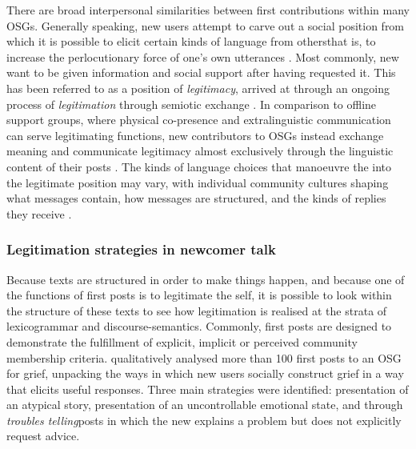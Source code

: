 There are broad interpersonal similarities between first contributions within many \glspl{OSG}. Generally speaking, new users attempt to carve out a social position from which it is possible to elicit certain kinds of language from others\textemdash{}that is, to increase the perlocutionary force of one's own utterances \cite{austin_how_1975,roberts_communicative_1996}. Most commonly, new  want to be given information and social support after having requested it. This has been referred to as a position of \emph{legitimacy}, arrived at through an ongoing process of \emph{legitimation} through semiotic exchange \cite{davies_communities_2005,smithson_developing_2012,van_leeuwen_legitimation_2007}. In comparison to offline support groups, where physical co\hyp{}presence and extralinguistic communication can serve legitimating functions, new contributors to \glspl{OSG} instead exchange meaning and communicate legitimacy almost exclusively through the linguistic content of their \glspl{post} \cite{galegher_legitimacy_1998}. The kinds of language choices that manoeuvre the  into the legitimate position may vary, with individual community cultures shaping what messages contain, how messages are structured, and the kinds of replies they receive \cite{gallagher_what_2015}.

\subsubsection{Legitimation strategies in newcomer talk}

Because texts are structured in order to make things happen, and because one of the functions of first \glspl{post} is to legitimate the self, it is possible to look within the structure of these texts to see how legitimation is realised at the strata of \gls{lexicogrammar} and \glspl{discourse-semantic}. Commonly, first \glspl{post} are designed to demonstrate the fulfillment of explicit, implicit or perceived community membership criteria. \textcite{varga2014grieving} qualitatively analysed more than 100 first \glspl{post} to an \gls{OSG} for grief, unpacking the ways in which new users socially construct grief in a way that elicits useful responses. Three main strategies were identified: presentation of an atypical story, presentation of an uncontrollable emotional state, and through \emph{troubles telling}\textemdash{}\glspl{post} in which the new  explains a problem but does not explicitly request advice.

